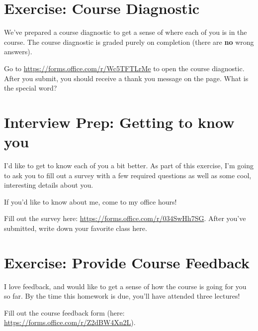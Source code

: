 \documentclass [12pt]{article}
\begin{document}
 
\section {Exercise: Course Diagnostic} 
 We've prepared a course diagnostic to get a sense of where each of you is in the course. The course diagnostic is graded purely on completion (there are \textbf{no} wrong answers). 

Go to \href{https://forms.office.com/r/Wc5TFTLrMe}{https://forms.office.com/r/Wc5TFTLrMe} to open the course diagnostic. After you submit, you should receive a thank you message on the page. What is the special word?


\pagebreak
\section{Interview Prep: Getting to know you}
 I'd like to get to know each of you a bit better. As part of this exercise, I'm going to ask you to fill out a survey with a few required questions as well as some cool, interesting details about you. 

If you'd like to know about me, come to my office hours!

Fill out the survey here: \href{https://forms.office.com/r/034SwHh7SG}{https://forms.office.com/r/034SwHh7SG}. After you've submitted, write down your favorite class here.


\section{Exercise: Provide Course Feedback}
 I love feedback, and would like to get a sense of how the course is going for you so far. By the time this homework is due, you'll have attended three lectures!

Fill out the course feedback form (here: \href{https://forms.office.com/r/Z2dBW4Xn2L}{https://forms.office.com/r/Z2dBW4Xn2L}).
\end{document}
